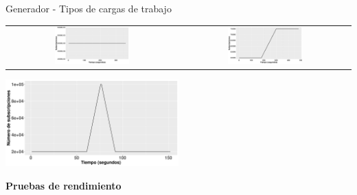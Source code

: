 \documentclass[12pt, spanish]{beamer}
\begin{document}
\begin{frame}{Generador - Tipos de cargas de trabajo} %

    \centering
    \begin{table}[]
        \begin{tabular}{c c}
            \includegraphics[width=0.45\textwidth]{images/types-of-workload/static-workload.pdf} & \includegraphics[width=0.45\textwidth]{images/types-of-workload/grow-workload.pdf}
        \end{tabular}
    \end{table}

    \includegraphics[width=0.5\textwidth]{images/types-of-workload/spike-workload.pdf}

\end{frame}


\begin{frame}%
    \begin{center}
        {\Large\textbf{Pruebas de rendimiento}}
    \end{center}
\end{frame}
\end{document}
